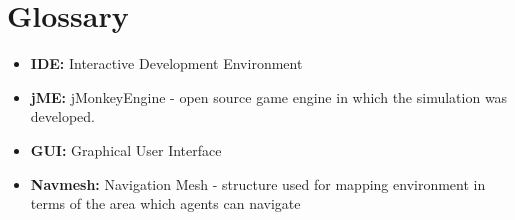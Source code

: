 \section{Glossary}
\begin{itemize}
\item{\textbf{IDE:} Interactive Development Environment}
\item{\textbf{jME:} jMonkeyEngine - open source game engine in which the simulation was developed.}
\item{\textbf{GUI:} Graphical User Interface}
\item{\textbf{Navmesh:} Navigation Mesh - structure used for mapping environment in terms of the area which agents can navigate}
\end{itemize}

